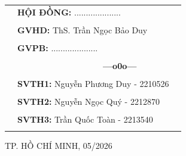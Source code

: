 \documentclass[a4paper]{article}
\begin{document}
\begin{titlepage}
\vspace{0.5cm}
\begin{tabular}{rll}
\hspace{6 cm} &  \textbf{\Large HỘI ĐỒNG:} {\Large ....................}
\\
\\
\hspace{6 cm} &   \textbf{\Large GVHD:} {\Large ThS. Trần Ngọc Bảo Duy}
\\
\\
\hspace{6 cm}  &   \textbf{\Large GVPB:} {\Large ....................}
\\
\\
\hspace{6 cm} &     \textbf{$\;$ $\;$$\;$$\;$$\;$$\;$$\;$$\;$$\;$$\;$$\;$$\;$$\;$$\;$$\;$$\;$$\;$$\;$$\;$$\;$$\;$$\;$$\;$$\;$$\;$$\;$$\;$$\;$$\;$$\;$$\;$$\;$$\;$$\;$ \Large ---o0o---}
\\
\\
\hspace{6 cm} &   \textbf{\Large SVTH1:} {\Large Nguyễn Phương Duy - 2210526}
\\
\\
\hspace{6 cm}&   \textbf{\Large SVTH2:}  {\Large Nguyễn Ngọc Quý - 2212870}
\\
\\
\hspace{6 cm} &   \textbf{\Large SVTH3:}  {\Large Trần Quốc Toàn - 2213540}
\\
\\
\end{tabular}
\vspace{0.5cm}
\begin{center}
{\Large TP. HỒ CHÍ MINH, 05/2026 }
\end{center}
\end{titlepage}



\end{document}
